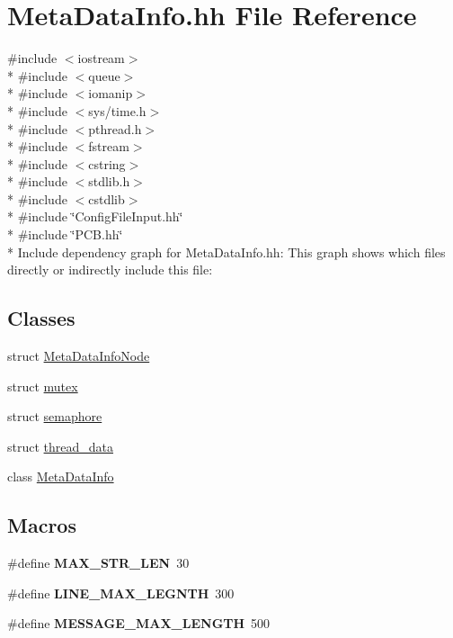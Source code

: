 \hypertarget{_meta_data_info_8hh}{}\section{Meta\+Data\+Info.\+hh File Reference}
\label{_meta_data_info_8hh}
{\ttfamily \#include $<$iostream$>$}\\*
{\ttfamily \#include $<$queue$>$}\\*
{\ttfamily \#include $<$iomanip$>$}\\*
{\ttfamily \#include $<$sys/time.\+h$>$}\\*
{\ttfamily \#include $<$pthread.\+h$>$}\\*
{\ttfamily \#include $<$fstream$>$}\\*
{\ttfamily \#include $<$cstring$>$}\\*
{\ttfamily \#include $<$stdlib.\+h$>$}\\*
{\ttfamily \#include $<$cstdlib$>$}\\*
{\ttfamily \#include \char`\"{}Config\+File\+Input.\+hh\char`\"{}}\\*
{\ttfamily \#include \char`\"{}P\+C\+B.\+hh\char`\"{}}\\*
Include dependency graph for Meta\+Data\+Info.\+hh\+:
This graph shows which files directly or indirectly include this file\+:
\subsection*{Classes}
\begin{DoxyCompactItemize}
\item 
struct \hyperlink{struct_meta_data_info_node}{Meta\+Data\+Info\+Node}
\item 
struct \hyperlink{structmutex}{mutex}
\item 
struct \hyperlink{structsemaphore}{semaphore}
\item 
struct \hyperlink{structthread__data}{thread\+\_\+data}
\item 
class \hyperlink{class_meta_data_info}{Meta\+Data\+Info}
\end{DoxyCompactItemize}
\subsection*{Macros}
\begin{DoxyCompactItemize}
\item 
\#define {\bfseries M\+A\+X\+\_\+\+S\+T\+R\+\_\+\+L\+EN}~30\hypertarget{_meta_data_info_8hh_a58ce36916c399104e18d32ff090f21c6}{}\label{_meta_data_info_8hh_a58ce36916c399104e18d32ff090f21c6}

\item 
\#define {\bfseries L\+I\+N\+E\+\_\+\+M\+A\+X\+\_\+\+L\+E\+G\+N\+TH}~300\hypertarget{_meta_data_info_8hh_a828e76c4673f1a0757e0380a5cf50325}{}\label{_meta_data_info_8hh_a828e76c4673f1a0757e0380a5cf50325}

\item 
\#define {\bfseries M\+E\+S\+S\+A\+G\+E\+\_\+\+M\+A\+X\+\_\+\+L\+E\+N\+G\+TH}~500\hypertarget{_meta_data_info_8hh_ad266dc7dec611fa99e4f2737d85deb17}{}\label{_meta_data_info_8hh_ad266dc7dec611fa99e4f2737d85deb17}

\end{DoxyCompactItemize}
